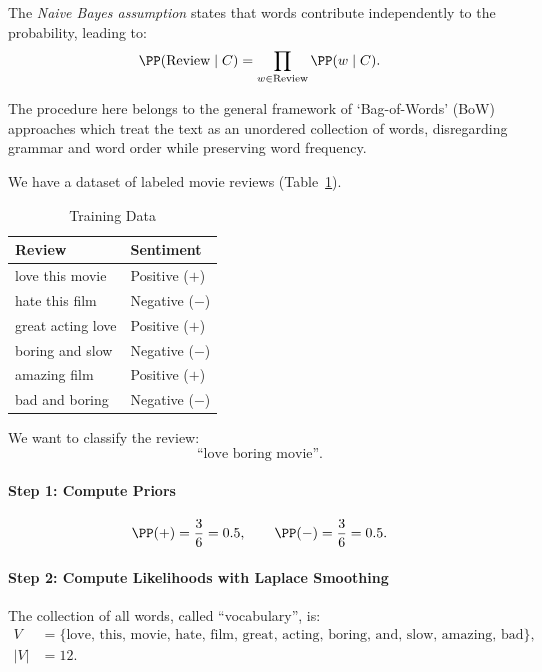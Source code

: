 The \emph{Naive Bayes assumption} states that words contribute independently
to the probability, leading to:
\begin{equation}\label{eq:ch6-bow-product}
  \PP(\text{Review}\mid C)=\prod_{w\in\text{Review}}\PP(w\mid C).
\end{equation}

\begin{remark}
The procedure here belongs to the general framework of `Bag-of-Words' (BoW)
approaches which treat the text as an unordered collection of words,
disregarding grammar and word order while preserving word frequency.
\end{remark}

We have a dataset of labeled movie reviews (Table~\ref{tab:ch6-training}).

\begin{table}[ht]
  \centering
  \begin{tabular}{ll}
    \toprule
    \textbf{Review} & \textbf{Sentiment}\\
    \midrule
    love this movie    & Positive ($+$)\\
    hate this film     & Negative ($-$)\\
    great acting love  & Positive ($+$)\\
    boring and slow    & Negative ($-$)\\
    amazing film       & Positive ($+$)\\
    bad and boring     & Negative ($-$)\\
    \bottomrule
  \end{tabular}
  \caption{Training Data}
  \label{tab:ch6-training}
\end{table}

We want to classify the review:
\begin{equation}\label{eq:ch6-testreview}
  \text{``love boring movie''}.
\end{equation}

\paragraph{Step 1: Compute Priors}
\begin{equation}\label{eq:ch6-priors}
  \PP(+)=\frac{3}{6}=0.5,\qquad \PP(-)=\frac{3}{6}=0.5.
\end{equation}

\paragraph{Step 2: Compute Likelihoods with Laplace Smoothing}
The collection of all words, called ``vocabulary'', is:
\begin{align}
  V&=\{\text{love, this, movie, hate, film, great, acting, boring,
        and, slow, amazing, bad}\},\label{eq:ch6-vocab}\\
  |V|&=12.\label{eq:ch6-vocabsize}
\end{align}

